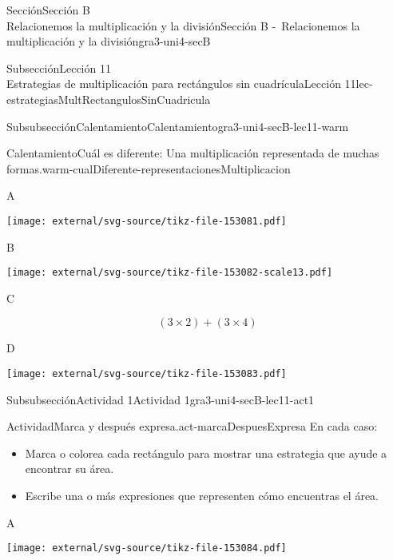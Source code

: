 \begin{sectionptx}{Sección}{{\Large Sección B\\}Relacionemos la multiplicación y la división}{}{Sección B -~Relacionemos la multiplicación y la división}{}{}{gra3-uni4-secB}
\begin{subsectionptx}{Subsección}{{\normalsize Lección 11\\[-0.05cm]}Estrategias de multiplicación para rectángulos sin cuadrícula}{}{Lección 11}{}{}{lec-estrategiasMultRectangulosSinCuadricula}
\begin{subsubsectionptx}{Subsubsección}{Calentamiento}{}{Calentamiento}{}{}{gra3-uni4-secB-lec11-warm}
\begin{exploration}{Calentamiento}{Cuál es diferente: Una multiplicación representada de muchas formas.}{warm-cualDiferente-representacionesMultiplicacion}
\begin{sidebyside}{2}{0.05}{0.05}{0.1}%
\begin{sbspanel}{0.4}%
A%
\par
\texttt{[image: external/svg-source/tikz-file-153081.pdf]}
\end{sbspanel}%
\begin{sbspanel}{0.4}%
B%
\par
\texttt{[image: external/svg-source/tikz-file-153082-scale13.pdf]}
\end{sbspanel}%
\end{sidebyside}%
\begin{sidebyside}{2}{0.05}{0.05}{0.1}%
\begin{sbspanel}{0.4}%
C%
\par
%
\begin{equation*}
(3\times 2) + (3\times 4)
\end{equation*}
%
\end{sbspanel}%
\begin{sbspanel}{0.4}%
D%
\par
\texttt{[image: external/svg-source/tikz-file-153083.pdf]}
\end{sbspanel}%
\end{sidebyside}%
\end{exploration}%
\end{subsubsectionptx}
%
%
\typeout{************************************************}
\typeout{************************************************}
%
\begin{subsubsectionptx}{Subsubsección}{Actividad 1}{}{Actividad 1}{}{}{gra3-uni4-secB-lec11-act1}
\begin{activity}{Actividad}{Marca y después expresa.}{act-marcaDespuesExpresa}%
En cada caso:%
%
\begin{itemize}[label=\textbullet]
\item{}Marca o colorea cada rectángulo para mostrar una estrategia que ayude a encontrar su área.%
\item{}Escribe una o más expresiones que representen cómo encuentras el área.%
\end{itemize}
\begin{sidebyside}{3}{0}{0}{0}%
\begin{sbspanel}{0.391}%
A%
\par
\texttt{[image: external/svg-source/tikz-file-153084.pdf]}
\end{sbspanel}%

\end{sidebyside}
\end{activity}
\end{subsubsectionptx}
\end{subsectionptx}
\end{sectionptx}
